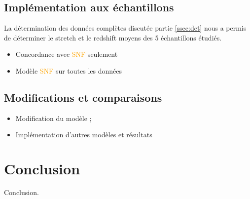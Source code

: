 \documentclass[a4paper, 12pt, svgnames]{article}
\begin{document}
\subsection{Implémentation aux échantillons}\label{ssec:surveys}
La détermination des données complètes discutée partie \ref{ssec:det} nous a
permis de déterminer le stretch et le redshift moyens des 5 échantillons
étudiés. 
\begin{itemize}
    \item Concordance avec \textcolor{orange}{SNF} seulement
    \item Modèle \textcolor{orange}{SNF} sur toutes les données
\end{itemize}

\subsection{Modifications et comparaisons}
\begin{itemize}
    \item Modification du modèle ;
    \item Implémentation d'autres modèles et résultats
\end{itemize}

\section{Conclusion}
Conclusion.

%


\end{document}
